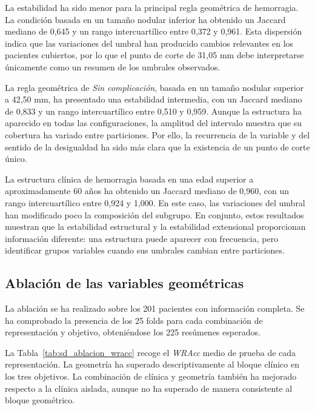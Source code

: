 La estabilidad ha sido menor para la principal regla geométrica de hemorragia. La condición basada en un tamaño nodular inferior ha obtenido un Jaccard mediano de 0,645 y un rango intercuartílico entre 0,372 y 0,961. Esta dispersión indica que las variaciones del umbral han producido cambios relevantes en los pacientes cubiertos, por lo que el punto de corte de 31,05 mm debe interpretarse únicamente como un resumen de los umbrales observados.

La regla geométrica de \textit{Sin complicación}, basada en un tamaño nodular superior a 42,50 mm, ha presentado una estabilidad intermedia, con un Jaccard mediano de 0,833 y un rango intercuartílico entre 0,510 y 0,959. Aunque la estructura ha aparecido en todas las configuraciones, la amplitud del intervalo muestra que su cobertura ha variado entre particiones. Por ello, la recurrencia de la variable y del sentido de la desigualdad ha sido más clara que la existencia de un punto de corte único.

La estructura clínica de hemorragia basada en una edad superior a aproximadamente 60 años ha obtenido un Jaccard mediano de 0,960, con un rango intercuartílico entre 0,924 y 1,000. En este caso, las variaciones del umbral han modificado poco la composición del subgrupo. En conjunto, estos resultados muestran que la estabilidad estructural y la estabilidad extensional proporcionan información diferente: una estructura puede aparecer con frecuencia, pero identificar grupos variables cuando sus umbrales cambian entre particiones.

\subsection{Ablación de las variables geométricas}
La ablación se ha realizado sobre los 201 pacientes con información completa. Se ha comprobado la presencia de los 25 folds para cada combinación de representación y objetivo, obteniéndose los 225 resúmenes esperados.


La Tabla~\ref{tab:sd_ablacion_wracc} recoge el \textit{WRAcc} medio de prueba de cada representación. La geometría ha superado descriptivamente al bloque clínico en los tres objetivos. La combinación de clínica y geometría también ha mejorado respecto a la clínica aislada, aunque no ha superado de manera consistente al bloque geométrico.

